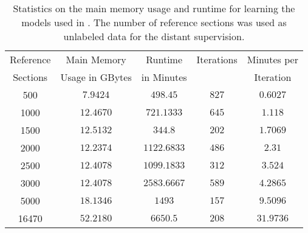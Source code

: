 \begin{table}[h]
\centering
\begin{tabular}{c c c c c}
 \toprule
 Reference & Main Memory  & Runtime & Iterations& Minutes per\\
  Sections &  Usage in GBytes &  in Minutes& &Iteration\\
 \midrule
 \hphantom{00}\num{500} &  \hphantom{0}$7.9424$ &\hphantom{0}$498.45$\hphantom{00} & $827$ &\hphantom{0}$0.6027$\\
 \hphantom{0}\num{1000}&  $12.4670$&\hphantom{0}$721.1333$ &$645$&\hphantom{0}$1.118$\hphantom{0}\\
 \hphantom{0}\num{1500} &  $12.5132$&\hphantom{0}$344.8$\hphantom{000}  &$202$ &\hphantom{0}$1.7069$ \\
 \hphantom{0}\num{2000} &  $12.2374$&$1122.6833$&$486$&\hphantom{0}$2.31$\hphantom{00}\\
 \hphantom{0}\num{2500} &  $12.4078$&$1099.1833$&$312$&\hphantom{0}$3.524$\hphantom{0}\\
 \hphantom{0}\num{3000} &  $12.4078$&$2583.6667$&$589$&\hphantom{0}$4.2865$\\
 \hphantom{0}\num{5000} &  $18.1346$&$1493$\hphantom{.0000}  &$157$  &\hphantom{0}$9.5096$ \\
 \num{16470}&  $52.2180$&$6650.5$\hphantom{000}  &$208$ &$31.9736$\\
 \bottomrule
\end{tabular}
\caption{Statistics on the main memory usage and runtime for learning the models used in . The number of reference sections was used as unlabeled data for the distant supervision.}
\label{tab:ssoar-number-of-tags}
\end{table}


